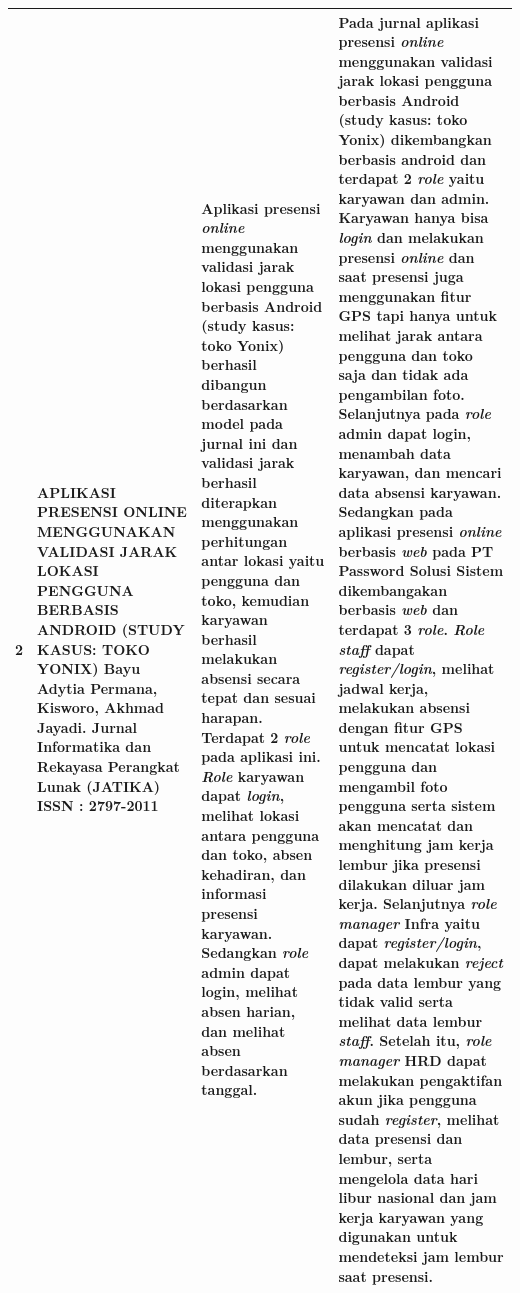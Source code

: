 \begin{longtable}{ |p{0.5cm}|p{3cm}|p{7cm}|p{12cm}|  }
 2 & APLIKASI PRESENSI ONLINE MENGGUNAKAN VALIDASI JARAK LOKASI PENGGUNA BERBASIS ANDROID (STUDY KASUS: TOKO YONIX)
 \newline Bayu Adytia Permana, Kisworo, Akhmad Jayadi.
 \newline Jurnal Informatika dan Rekayasa Perangkat Lunak (JATIKA)
 \newline ISSN : 2797-2011 
 & Aplikasi presensi \textit{online} menggunakan validasi jarak lokasi pengguna berbasis Android (study kasus: toko Yonix) berhasil dibangun berdasarkan model pada jurnal ini dan validasi jarak berhasil diterapkan menggunakan perhitungan antar lokasi yaitu pengguna dan toko, kemudian karyawan berhasil melakukan absensi secara tepat dan sesuai harapan. Terdapat 2 \textit{role} pada aplikasi ini. \textit{Role} karyawan dapat \textit{login}, melihat lokasi antara pengguna dan toko, absen kehadiran, dan informasi presensi karyawan. Sedangkan \textit{role} admin dapat login, melihat absen harian, dan melihat absen berdasarkan tanggal.
 & Pada jurnal aplikasi presensi \textit{online} menggunakan validasi jarak lokasi pengguna berbasis Android (study kasus: toko Yonix) dikembangkan berbasis android dan terdapat 2 \textit{role} yaitu karyawan dan admin. Karyawan hanya bisa \textit{login} dan melakukan presensi \textit{online} dan saat presensi juga menggunakan fitur GPS tapi hanya untuk melihat jarak antara pengguna dan toko saja dan tidak ada pengambilan foto. Selanjutnya pada \textit{role} admin dapat login, menambah data karyawan, dan mencari data absensi karyawan.
 \newline 
  \newline
  Sedangkan pada aplikasi presensi \textit{online} berbasis \textit{web} pada PT Password Solusi Sistem dikembangakan berbasis \textit{web} dan terdapat 3 \textit{role}. \textit{Role staff} dapat \textit{register/login}, melihat jadwal kerja, melakukan absensi dengan fitur GPS untuk mencatat lokasi pengguna dan mengambil foto pengguna serta sistem akan mencatat dan menghitung jam kerja lembur jika presensi dilakukan diluar jam kerja. Selanjutnya \textit{role manager} Infra yaitu dapat \textit{register/login}, dapat melakukan \textit{reject} pada data lembur yang tidak valid serta melihat data lembur \textit{staff}. Setelah itu, \textit{role manager} HRD dapat melakukan pengaktifan akun jika pengguna sudah \textit{register}, melihat data presensi dan lembur, serta mengelola data hari libur nasional dan jam kerja karyawan yang digunakan untuk mendeteksi jam lembur saat presensi.
 \\ \hline


\end{longtable}
